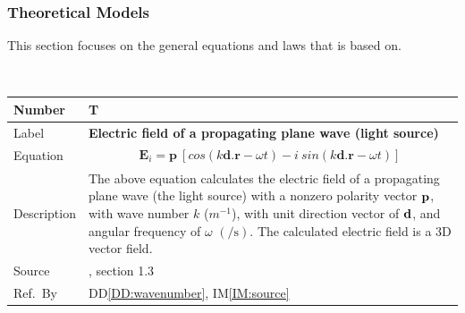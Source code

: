 \documentclass[12pt]{article}
\newcommand{\colBwidth}{0.82\textwidth} \newcommand{\colCwidth}{0.1\textwidth}
\begin{document}
	\subsubsection{Theoretical Models}\label{sec_theoretical}
	
	This section focuses on the general equations and laws that \progname{} is based
	on. %
	
	~\newline \noindent \begin{minipage}{\textwidth}
		\renewcommand*{\arraystretch}{1.5} \begin{tabular}{| p{\colAwidth} |
				p{\colBwidth}|} \hline \rowcolor[gray]{0.9} Number&
			T{theorynum}\thetheorynum \label{TM:source}\\ \hline Label&\bf
			Electric field of a propagating plane wave (light source) \\ \hline Equation&
			\begin{equation} \label{eq:planewave} \begin{gathered} \textbf{E}_{i}=
					\textbf{p}\ [ cos(k\textbf{d.r}-\omega t)- i \ sin(k\textbf{d.r}-\omega t)] \end{gathered} 
			\end{equation} \\
			
			
			\hline Description & The above equation calculates the electric field of a
			propagating plane wave (the light source) with a nonzero polarity vector $\bf
			p$, with wave number $k$ ($m^{-1}$), with unit direction vector of $\bf d$,
			and angular frequency of $\omega$ $(\si{\per \second})$. The calculated
			electric field is a 3D vector field. \\ \hline Source &
			
			\cite{monk2003finite}, section 1.3 \\ %
			\hline Ref.\ By & DD\ref{DD:wavenumber}, IM\ref{IM:source} \\ \hline
	\end{tabular} \end{minipage}\\
	
	
\end{document}

